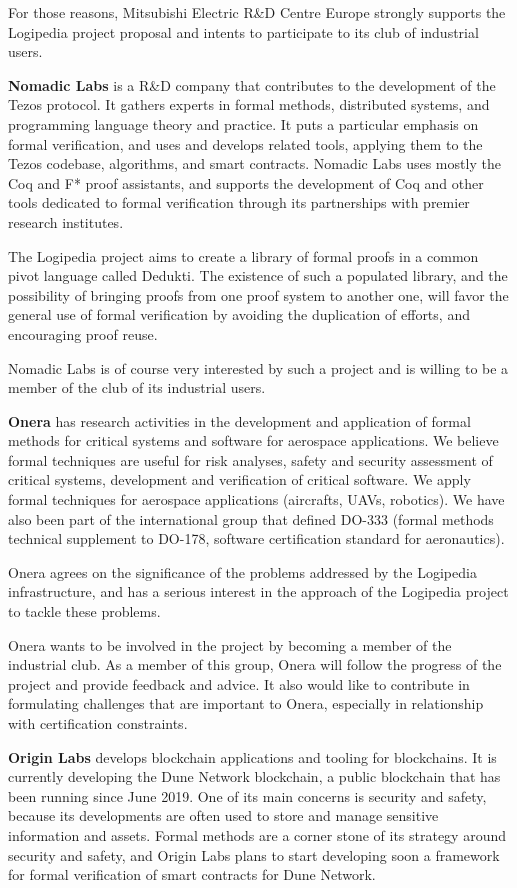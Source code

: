 For those reasons, Mitsubishi Electric R\&D Centre Europe strongly
supports the Logipedia project proposal and intents to participate to
its club of industrial users.

{\bf Nomadic Labs} is a R\&D company that contributes to the
development of the Tezos protocol. It gathers experts in formal
methods, distributed systems, and programming language theory and
practice. It puts a particular emphasis on formal verification, and
uses and develops related tools, applying them to the Tezos codebase,
algorithms, and smart contracts. Nomadic Labs uses mostly the Coq and
F* proof assistants, and supports the development of Coq and other
tools dedicated to formal verification through its partnerships with
premier research institutes.

The Logipedia project aims to create a library of formal proofs in a
common pivot language called Dedukti. The existence of such a
populated library, and the possibility of bringing proofs from one
proof system to another one, will favor the general use of formal
verification by avoiding the duplication of efforts, and encouraging
proof reuse.

Nomadic Labs is of course very interested by such a project and is
willing to be a member of the club of its industrial users.


{\bf Onera} has research activities in the development and application
of formal methods for critical systems and software for aerospace
applications. We believe formal techniques are useful for risk
analyses, safety and security assessment of critical systems,
development and verification of critical software. We apply formal
techniques for aerospace applications (aircrafts, UAVs, robotics). We
have also been part of the international group that defined DO-333
(formal methods technical supplement to DO-178, software certification
standard for aeronautics).

Onera agrees on the significance of the problems addressed by the
Logipedia infrastructure, and has a serious interest in the approach
of the Logipedia project to tackle these problems.

Onera wants to be involved in the project by becoming a member of the
industrial club. As a member of this group, Onera will follow the
progress of the project and provide feedback and advice. It also would
like to contribute in formulating challenges that are important to
Onera, especially in relationship with certification constraints.

{\bf Origin Labs} develops blockchain applications and tooling for
blockchains. It is currently developing the Dune Network blockchain, a
public blockchain that has been running since June 2019. One of its
main concerns is security and safety, because its developments are
often used to store and manage sensitive information and
assets. Formal methods are a corner stone of its strategy around
security and safety, and Origin Labs plans to start developing soon a
framework for formal verification of smart contracts for Dune Network.

